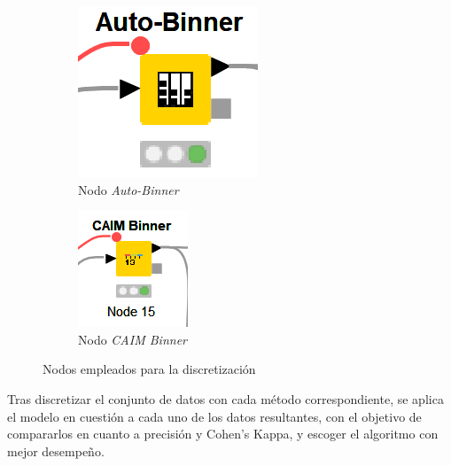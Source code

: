 \begin{figure}[H]
	\centering
	\begin{subfigure}[b]{0.25\linewidth}
		\centering
		\includegraphics[width=0.5\linewidth]{"figuras/capi 2/auto-binner-nodo"}
		\caption{Nodo \textit{Auto-Binner}}
		\label{fig:auto-binner-nodo}
	\end{subfigure}
	\hspace{1.5cm}
	\begin{subfigure}[b]{0.25\linewidth}
		\centering
		\includegraphics[width=0.5\linewidth]{"figuras/capi 2/caim-binner-nodo"}
		\caption{Nodo \textit{CAIM Binner}}
		\label{fig:caim-binner-nodo}
	\end{subfigure}
	\caption{Nodos empleados para la discretización}
	\label{fig:discretizacion-nodos}
\end{figure}

Tras discretizar el conjunto de datos con cada método correspondiente, se aplica el modelo en cuestión a cada uno de los datos resultantes, con el objetivo de compararlos en cuanto a precisión y Cohen's Kappa, y escoger el algoritmo con mejor desempeño. 


